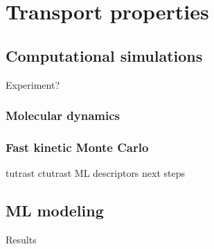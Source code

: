 \documentclass[main]{subfiles}
\begin{document}
\chapter{Transport properties}
\vspace*{-1\baselineskip}
\section{Computational simulations}
Experiment?
\subsection{Molecular dynamics}

\subsection{Fast kinetic Monte Carlo}
tutrast
ctutrast
ML descriptors
next steps

\section{ML modeling}

Results

\OnlyInSubfile{\printglobalbibliography}
\end{document}
